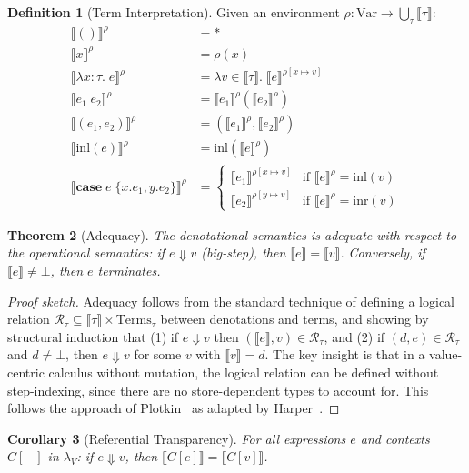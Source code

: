 \documentclass[11pt]{article}
\newtheorem{theorem}{Theorem}[section]
\newtheorem{corollary}[theorem]{Corollary}
\theoremstyle{definition}
\newtheorem{definition}[theorem]{Definition}
\theoremstyle{remark}
\newcommand{\sem}[1]{\llbracket #1 \rrbracket}
\begin{document}
\begin{definition}[Term Interpretation]
\label{def:term-interp}
Given an environment $\rho : \mathrm{Var} \to \bigcup_\tau \sem{\tau}$:
\begin{align}
  \sem{()}^\rho &= \ast \\
  \sem{x}^\rho &= \rho(x) \\
  \sem{\lambda x:\tau.\; e}^\rho &=
    \lambda v \in \sem{\tau}.\; \sem{e}^{\rho[x \mapsto v]} \\
  \sem{e_1\; e_2}^\rho &= \sem{e_1}^\rho(\sem{e_2}^\rho) \\
  \sem{(e_1, e_2)}^\rho &= (\sem{e_1}^\rho, \sem{e_2}^\rho) \\
  \sem{\mathrm{inl}(e)}^\rho &= \mathrm{inl}(\sem{e}^\rho) \\
  \sem{\mathbf{case}\; e\; \{x.e_1, y.e_2\}}^\rho &=
    \begin{cases}
      \sem{e_1}^{\rho[x \mapsto v]} & \text{if } \sem{e}^\rho = \mathrm{inl}(v) \\
      \sem{e_2}^{\rho[y \mapsto v]} & \text{if } \sem{e}^\rho = \mathrm{inr}(v)
    \end{cases}
\end{align}
\end{definition}

\begin{theorem}[Adequacy]
\label{thm:adequacy}
The denotational semantics is adequate with respect to the operational
semantics: if $e \Downarrow v$ (big-step), then $\sem{e} = \sem{v}$.
Conversely, if $\sem{e} \neq \bot$, then $e$ terminates.
\end{theorem}

\begin{proof}[Proof sketch]
Adequacy follows from the standard technique of defining a logical
relation $\mathcal{R}_\tau \subseteq \sem{\tau} \times
\mathrm{Terms}_\tau$ between denotations and terms, and showing by
structural induction that (1) if $e \Downarrow v$ then $(\sem{e},
v) \in \mathcal{R}_\tau$, and (2) if $(d, e) \in \mathcal{R}_\tau$
and $d \neq \bot$, then $e \Downarrow v$ for some $v$ with
$\sem{v} = d$.  The key insight is that in a value-centric calculus
without mutation, the logical relation can be defined without
step-indexing, since there are no store-dependent types to account
for.  This follows the approach of Plotkin~\cite{plotkin1977lcf}
as adapted by Harper~\cite{harper2016practical}.
\end{proof}

\begin{corollary}[Referential Transparency]
\label{cor:ref-trans}
For all expressions $e$ and contexts $C[-]$ in $\lambda_V$:
if $e \Downarrow v$, then $\sem{C[e]} = \sem{C[v]}$.
\end{corollary}
\end{document}
